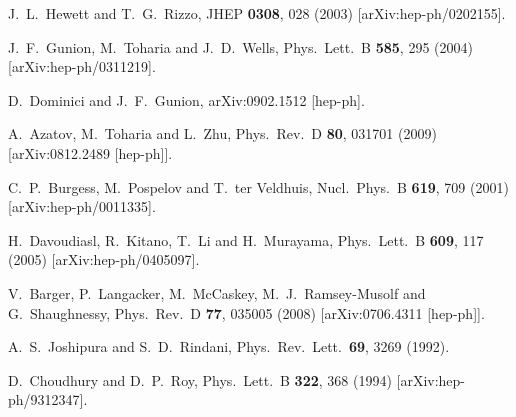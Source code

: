 \documentclass[12pt]{article}
\begin{document}
\begin{thebibliography}{9}
  J.~L.~Hewett and T.~G.~Rizzo,
  JHEP {\bf 0308}, 028 (2003)
  [arXiv:hep-ph/0202155].

  J.~F.~Gunion, M.~Toharia and J.~D.~Wells,
  Phys.\ Lett.\  B {\bf 585}, 295 (2004)
  [arXiv:hep-ph/0311219].


  D.~Dominici and J.~F.~Gunion,
  arXiv:0902.1512 [hep-ph].

  A.~Azatov, M.~Toharia and L.~Zhu,
  Phys.\ Rev.\  D {\bf 80}, 031701 (2009)
  [arXiv:0812.2489 [hep-ph]].



  
  C.~P.~Burgess, M.~Pospelov and T.~ter Veldhuis,
  Nucl.\ Phys.\  B {\bf 619}, 709 (2001)
  [arXiv:hep-ph/0011335].

  H.~Davoudiasl, R.~Kitano, T.~Li and H.~Murayama,
  Phys.\ Lett.\  B {\bf 609}, 117 (2005)
  [arXiv:hep-ph/0405097].

  
  V.~Barger, P.~Langacker, M.~McCaskey, M.~J.~Ramsey-Musolf and G.~Shaughnessy,
  Phys.\ Rev.\  D {\bf 77}, 035005 (2008)
  [arXiv:0706.4311 [hep-ph]].


  A.~S.~Joshipura and S.~D.~Rindani,
  Phys.\ Rev.\ Lett.\  {\bf 69}, 3269 (1992).

  D.~Choudhury and D.~P.~Roy,
  Phys.\ Lett.\  B {\bf 322}, 368 (1994)
  [arXiv:hep-ph/9312347].


\end{thebibliography}
\end{document}
